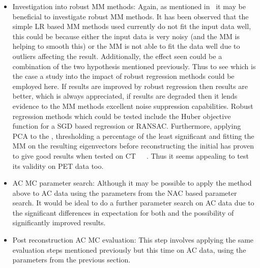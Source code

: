 \begin{itemize}
                \item Investigation into robust \gls{MM} methods: Again, as mentioned in~ it may be beneficial to investigate robust \gls{MM} methods. It has been observed that the simple \gls{LR} based \gls{MM} methods used currently do not fit the input data well, this could be because either the input data is very noisy (and the \gls{MM} is helping to smooth this) or the \gls{MM} is not able to fit the data well due to outliers affecting the result. Additionally, the effect seen could be a combination of the two hypothesis mentioned previously. Thus to see which is the case a study into the impact of robust regression methods could be employed here. If results are improved by robust regression then results are better, which is always appreciated, if results are degraded then it lends evidence to the \gls{MM} methods excellent noise suppression capabilities. Robust regression methods which could be tested include the Huber objective function for a \gls{SGD} based regression or \gls{RANSAC}. Furthermore, applying \gls{PCA} to the , thresholding a percentage of the least significant  and fitting the \gls{MM} on the resulting eigenvectors before reconstructing the initial  has proven to give good results when tested on \gls{CT}~~~. Thus it seems appealing to test its validity on \gls{PET} data too.
    
                \item \gls{AC} \gls{MC} parameter search: Although it may be possible to apply the method above to \gls{AC} data using the parameters from the \gls{NAC} based parameter search. It would be ideal to do a further parameter search on \gls{AC} data due to the significant differences in expectation for both and the possibility of significantly improved results.
    
                \item Post reconstruction \gls{AC} \gls{MC} evaluation: This step involves applying the same evaluation steps mentioned previously but this time on \gls{AC} data, using the parameters from the previous section. 
    

\end{itemize}
